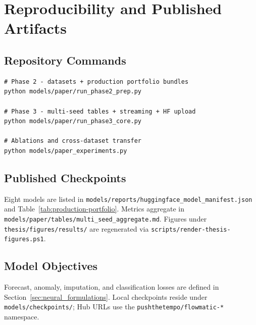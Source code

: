 %
%
\chapter{Reproducibility and Published Artifacts}
\label{app:repro}

\section{Repository Commands}

\begin{Verbatim}[fontsize=\small]
# Phase 2 - datasets + production portfolio bundles
python models/paper/run_phase2_prep.py

# Phase 3 - multi-seed tables + streaming + HF upload
python models/paper/run_phase3_core.py

# Ablations and cross-dataset transfer
python models/paper_experiments.py
\end{Verbatim}

\section{Published Checkpoints}

Eight models are listed in \texttt{models/reports/huggingface\_model\_manifest.json} and Table~\ref{tab:production-portfolio}. Metrics aggregate in \texttt{models/paper/tables/multi\_seed\_aggregate.md}. Figures under \texttt{thesis/figures/results/} are regenerated via \texttt{scripts/render-thesis-figures.ps1}.

\section{Model Objectives}

Forecast, anomaly, imputation, and classification losses are defined in Section~\ref{sec:neural_formulations}. Local checkpoints reside under \texttt{models/checkpoints/}; Hub URLs use the \texttt{pushthetempo/flowmatic-*} namespace.
